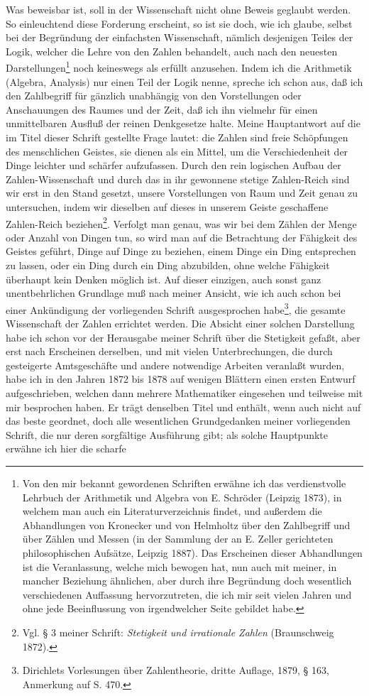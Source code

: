 \documentclass[11pt]{article}
\begin{document}
Was beweisbar ist, soll in der Wissenschaft nicht ohne Beweis geglaubt werden. So einleuchtend diese Forderung erscheint, so ist sie doch, wie ich glaube, selbst bei der Begründung der einfachsten Wissenschaft, nämlich desjenigen Teiles der Logik, welcher die Lehre von den Zahlen behandelt, auch nach den neuesten Darstellungen\footnote{Von den mir bekannt gewordenen Schriften erwähne ich das verdienstvolle Lehrbuch der Arithmetik und Algebra von E. Schröder (Leipzig 1873), in welchem man auch ein Literaturverzeichnis findet, und außerdem die Abhandlungen von Kronecker und von Helmholtz über den Zahlbegriff und über Zählen und Messen (in der Sammlung der an E. Zeller gerichteten philosophischen Aufsätze, Leipzig 1887). Das Erscheinen dieser Abhandlungen ist die Veranlassung, welche mich bewogen hat, nun auch mit meiner, in mancher Beziehung ähnlichen, aber durch ihre Begründung doch wesentlich verschiedenen Auffassung hervorzutreten, die ich mir seit vielen Jahren und ohne jede Beeinflussung von irgendwelcher Seite gebildet habe.} noch keineswegs als erfüllt anzusehen. Indem ich die Arithmetik (Algebra, Analysis) nur einen Teil der Logik nenne, spreche ich schon aus, daß ich den Zahlbegriff für gänzlich unabhängig von den Vorstellungen oder Anschauungen des Raumes und der Zeit, daß ich ihn vielmehr für einen unmittelbaren Ausfluß der reinen Denkgesetze halte. Meine Hauptantwort auf die im Titel dieser Schrift gestellte Frage lautet: die Zahlen sind freie Schöpfungen des menschlichen Geistes, sie dienen als ein Mittel, um die Verschiedenheit der Dinge leichter und schärfer aufzufassen. Durch den rein logischen Aufbau der Zahlen-Wissenschaft und durch das in ihr gewonnene stetige Zahlen-Reich sind wir erst in den Stand gesetzt, unsere Vorstellungen von Raum und Zeit genau zu untersuchen, indem wir dieselben auf dieses in unserem Geiste geschaffene Zahlen-Reich beziehen\footnote{Vgl. § 3 meiner Schrift: \emph{Stetigkeit und irrationale Zahlen} (Braunschweig 1872).}. Verfolgt man genau, was wir bei dem Zählen der Menge oder Anzahl von Dingen tun, so wird man auf die Betrachtung der Fähigkeit des Geistes geführt, Dinge auf Dinge zu beziehen, einem Dinge ein Ding entsprechen zu lassen, oder ein Ding durch ein Ding abzubilden, ohne welche Fähigkeit überhaupt kein Denken möglich ist. Auf dieser einzigen, auch sonst ganz unentbehrlichen Grundlage muß nach meiner Ansicht, wie ich auch schon bei einer Ankündigung der vorliegenden Schrift ausgesprochen habe\footnote{Dirichlets Vorlesungen über Zahlentheorie, dritte Auflage, 1879, § 163, Anmerkung auf S. 470.}, die gesamte Wissenschaft der Zahlen errichtet werden. Die Absicht einer solchen Darstellung habe ich schon vor der Herausgabe meiner Schrift über die Stetigkeit gefaßt, aber erst nach Erscheinen derselben, und mit vielen Unterbrechungen, die durch gesteigerte Amtsgeschäfte und andere notwendige Arbeiten veranlaßt wurden, habe ich in den Jahren 1872 bis 1878 auf wenigen Blättern einen ersten Entwurf aufgeschrieben, welchen dann mehrere Mathematiker eingesehen und teilweise mit mir besprochen haben. Er trägt denselben Titel und enthält, wenn auch nicht auf das beste geordnet, doch alle wesentlichen Grundgedanken meiner vorliegenden Schrift, die nur deren sorgfältige Ausführung gibt; als solche Hauptpunkte erwähne ich hier die scharfe 
\end{document}
